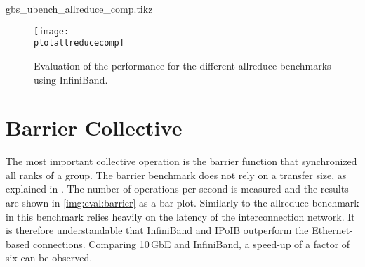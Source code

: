\newcommand{\plotallreducecomp}{gbs_ubench_allreduce_comp.tikz}
\begin{filecontents}{\plotallreducecomp}

\newcommand{\dir}{result-ib}
\newcommand{\csvsum}{\dir /gbs_ubench_allreduce_sum.csv}
\newcommand{\csvmin}{\dir /gbs_ubench_allreduce_min.csv}
\newcommand{\csvmax}{\dir /gbs_ubench_allreduce_max.csv}

\end{filecontents}

\begin{figure}[htb]
\centering
\texttt{[image: \\plotallreducecomp]}
\caption{Evaluation of the performance for the different allreduce benchmarks using InfiniBand.}
\label{img:eval:allreduce-types}
\end{figure}

\section{Barrier Collective}

The most important collective operation is the barrier function that synchronized all ranks of a group. The barrier benchmark does not rely on a transfer size, as explained in . The number of operations per second is measured and the results are shown in \autoref{img:eval:barrier} as a bar plot. Similarly to the allreduce benchmark in  this benchmark relies heavily on the latency of the interconnection network. It is therefore understandable that InfiniBand and \ac{IPoIB} outperform the Ethernet-based connections. Comparing 10\,GbE and InfiniBand, a speed-up of a factor of six can be observed.


